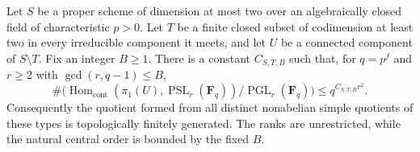 \begin{corollary}
\label{D:nonnormal-bounded-centre-projective-growth}
Let $S$ be a proper scheme of dimension at most two over an algebraically
closed field of characteristic $p>0$. Let $T$ be a finite closed subset
of codimension at least two in every irreducible component it meets,
and let $U$ be a connected component of $S\setminus T$. Fix an integer
$B\ge1$. There is a constant $C_{S,T,B}$ such that, for $q=p^f$ and
$r\ge2$ with $\gcd(r,q-1)\le B$,
\[
 \#\bigl(\operatorname{Hom}_{\mathrm{cont}}
 (\pi_1(U),\operatorname{PSL}_r(\mathbf F_q)) /
 \operatorname{PGL}_r(\mathbf F_q)\bigr)
 \le q^{C_{S,T,B}r^2}.
\]
Consequently the quotient formed from all distinct nonabelian simple
quotients of these types is topologically finitely generated. The
ranks are unrestricted, while the natural central order is bounded
by the fixed $B$.
\end{corollary}
